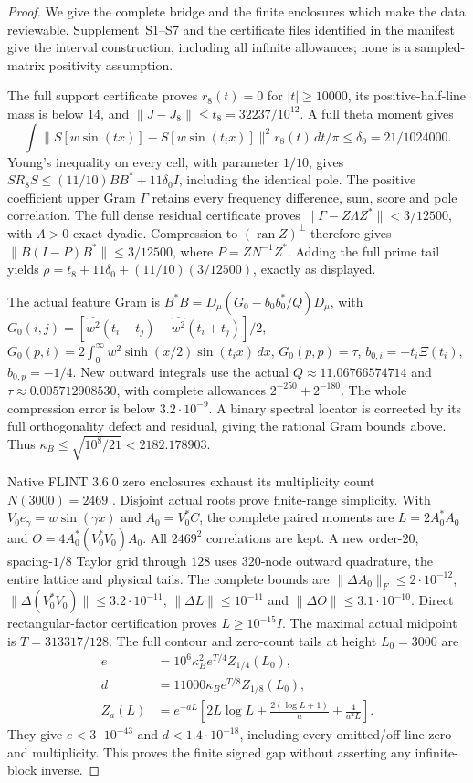 \documentclass[12pt]{article}
\theoremstyle{remark}\newtheorem{remark}[theorem]{Remark}
\newcommand{\Ran}{\operatorname{ran}}
\newcommand{\dd}{\,d}
\begin{document}
\begin{proof}
We give the complete bridge and the finite enclosures which make the
data reviewable. Supplement~S1--S7 and the certificate files identified in the
manifest give the interval construction, including all infinite
allowances; none is a sampled-matrix positivity assumption.

The full support certificate proves $r_8(t)=0$ for $|t|\ge10000$,
its positive-half-line mass is below $14$, and
$\|J-J_8\|\le t_8=32237/10^{12}$. A full theta moment gives
\[
 \int\|S[w\sin(tx)]-S[w\sin(t_ix)]\|^2r_8(t)\dd t/\pi
 \le\delta_0=21/1024000.
\]
Young's inequality on every cell, with parameter $1/10$, gives
$SR_8S\le(11/10)BB^*+11\delta_0I$, including the identical pole.
The positive coefficient upper Gram $\Gamma$ retains every
frequency difference, sum, score and pole correlation. The full
dense residual certificate proves
$\|\Gamma-Z\Lambda Z^*\|<3/12500$, with $\Lambda>0$ exact dyadic.
Compression to $(\Ran Z)^\perp$ therefore gives
$\|B(I-P)B^*\|\le3/12500$, where $P=ZN^{-1}Z^*$.
Adding the full prime tail yields
$\rho=t_8+11\delta_0+(11/10)(3/12500)$, exactly as displayed.

The actual feature Gram is
$B^*B=D_\mu(G_0-b_0b_0^*/Q)D_\mu$, with
$G_0(i,j)=[\widehat{w^2}(t_i-t_j)-\widehat{w^2}(t_i+t_j)]/2$,
$G_0(p,i)=2\int_0^\infty w^2\sinh(x/2)\sin(t_ix)\dd x$,
$G_0(p,p)=\tau$, $b_{0,i}=-t_i\Xi(t_i)$, $b_{0,p}=-1/4$.
New outward integrals use the actual $Q\approx11.06766574714$
and $\tau\approx0.005712908530$, with complete allowances
$2^{-250}+2^{-180}$. The whole compression error is below
$3.2\cdot10^{-9}$. A binary spectral locator is corrected by its full
orthogonality defect and residual, giving the rational Gram bounds
above. Thus $\kappa_B\le\sqrt{10^8/21}<2182.178903$.

Native FLINT $3.6.0$ zero enclosures exhaust its multiplicity count
$N(3000)=2469$ \cite{FLINT}. Disjoint actual roots prove finite-range
simplicity. With $V_0e_\gamma=w\sin(\gamma x)$ and $A_0=V_0^*C$,
the complete paired moments are $L=2A_0^*A_0$ and
$O=4A_0^*(V_0^*V_0)A_0$. All $2469^2$ correlations are kept.
A new order-$20$, spacing-$1/8$ Taylor grid through $128$ uses
$320$-node outward quadrature, the entire lattice and physical tails.
The complete bounds are $\|\Delta A_0\|_F\le2\cdot10^{-12}$,
$\|\Delta(V_0^*V_0)\|\le3.2\cdot10^{-11}$,
$\|\Delta L\|\le10^{-11}$ and $\|\Delta O\|\le3.1\cdot10^{-10}$.
Direct rectangular-factor certification proves $L\ge10^{-15}I$.
The maximal actual midpoint is $T=313317/128$. The full contour
and zero-count tails at height $L_0=3000$ are
\begin{align*}
 e&=10^6\kappa_B^2e^{T/4}Z_{1/4}(L_0),\\
 d&=11000\kappa_Be^{T/8}Z_{1/8}(L_0),\\
 Z_a(L)&=e^{-aL}\left[2L\log L+
                \frac{2(\log L+1)}a+\frac4{a^2L}\right].
\end{align*}
They give $e<3\cdot10^{-43}$ and $d<1.4\cdot10^{-18}$, including
every omitted/off-line zero and multiplicity. This proves the finite
signed gap without asserting any infinite-block inverse.


\end{proof}
\end{document}
